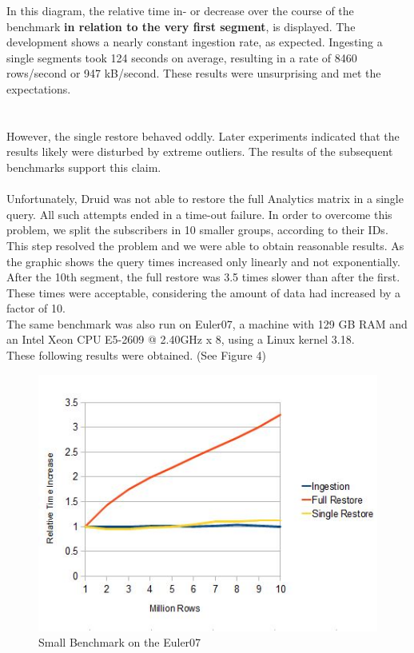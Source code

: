 \documentclass[11pt,singlecolumn]{scrartcl}
\begin{document}
In this diagram, the relative time in- or decrease over the course of the benchmark  \textbf{in relation to the very first segment}, is displayed. The development shows a nearly constant ingestion rate, as expected. Ingesting a single segments took 124 seconds on average, resulting in a rate of 8460 rows/second or 947 kB/second. These results were unsurprising and met the expectations.\\\\\\
However, the single restore behaved oddly. Later experiments indicated that the results likely were disturbed by extreme outliers. The results of the subsequent benchmarks support this claim.\\\\
Unfortunately, Druid was not able to restore the full Analytics matrix in a single query. All such attempts ended in a time-out failure. In order to overcome this problem, we split the subscribers in 10 smaller groups, according to their IDs. This step resolved the problem and we were able to obtain reasonable results.
As the graphic shows the query times increased only linearly and not exponentially. After the 10th segment, the full restore was 3.5 times slower than after the first. These times were acceptable, considering the amount of data had increased by a factor of 10. 
\\[1cm]
The same benchmark was also run on Euler07, a machine with 129 GB RAM  and an Intel Xeon CPU E5-2609 @ 2.40GHz x 8, using a Linux kernel 3.18.\\
These following results were obtained. (See Figure 4)  

\begin{figure}[h]
\includegraphics[scale=1.1]{eul.jpg}
\caption{Small Benchmark on the Euler07}
\end{figure}
\end{document}
